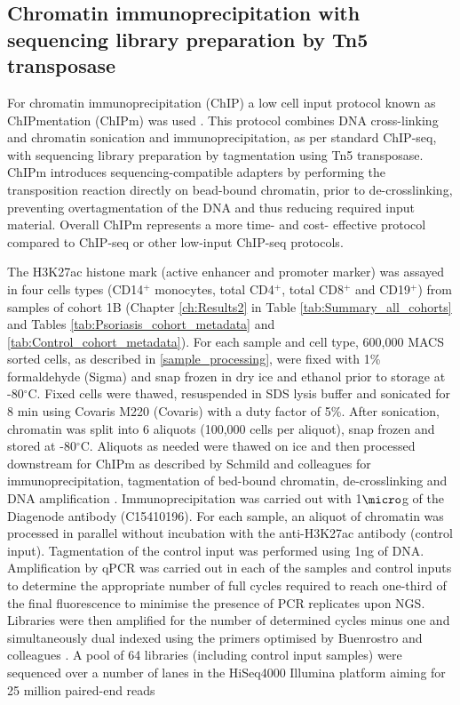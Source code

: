 \subsection{Chromatin immunoprecipitation with sequencing library preparation by Tn5 transposase}
For chromatin immunoprecipitation (ChIP) a low cell input protocol known as ChIPmentation (ChIPm) was used \parencite{Schmidl2015}. This protocol combines DNA cross-linking and chromatin sonication and immunoprecipitation, as per standard ChIP-seq, with sequencing library preparation by tagmentation using Tn5 transposase. ChIPm introduces sequencing-compatible adapters by performing the transposition reaction directly on bead-bound chromatin, prior to de-crosslinking, preventing overtagmentation of the DNA and thus reducing required input material. Overall ChIPm represents a more time- and cost- effective protocol compared to ChIP-seq or other low-input ChIP-seq protocols. 

The H3K27ac histone mark (active enhancer and promoter marker) was assayed in four cells types (CD14$^+$ monocytes, total CD4$^+$, total CD8$^+$ and CD19$^+$) from samples of cohort 1B (Chapter \ref{ch:Results2} in Table \ref{tab:Summary_all_cohorts} and Tables \ref{tab:Psoriasis_cohort_metadata} and \ref{tab:Control_cohort_metadata}). For each sample and cell type, 600,000 MACS sorted cells, as described in \ref{sample_processing}, were fixed with 1\% formaldehyde (Sigma) and snap frozen in dry ice and ethanol prior to storage at -80{$^\circ$}C. Fixed cells were thawed, resuspended in SDS lysis buffer and sonicated for 8 min using Covaris M220 (Covaris) with a duty factor of 5\%. After sonication, chromatin was split into 6 aliquots (100,000 cells per aliquot), snap frozen and stored at -80{$^\circ$}C. Aliquots as needed were thawed on ice and then processed downstream for ChIPm as described by Schmild and colleagues for immunoprecipitation, tagmentation of bed-bound chromatin, de-crosslinking and DNA amplification \parencite{Schmidl2015}. Immunoprecipitation was carried out with 1$\micro$g of the Diagenode antibody (C15410196). For each sample, an aliquot of chromatin was processed in parallel without incubation with the anti-H3K27ac antibody (control input). Tagmentation of the control input was performed using 1ng of DNA. Amplification by qPCR was carried out in each of the samples and control inputs to determine the appropriate number of full cycles required to reach one-third of the final fluorescence to minimise the presence of PCR replicates upon NGS. Libraries were then amplified for the number of determined cycles minus one and simultaneously dual indexed using the primers optimised by Buenrostro and colleagues \parencite{Buenrostro2015}. A pool of 64 libraries (including control input samples) were sequenced over a number of lanes in the HiSeq4000 Illumina platform aiming for 25 million paired-end reads



